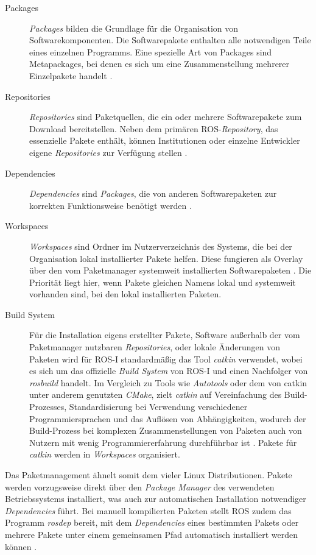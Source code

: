 \begin{description}
    \item[Packages] \textit{Packages} bilden die Grundlage für die Organisation von Softwarekomponenten. Die Softwarepakete enthalten alle notwendigen Teile eines einzelnen Programms. Eine spezielle Art von Packages sind Metapackages, bei denen es sich um eine Zusammenstellung mehrerer Einzelpakete handelt \cite[Absatz~1]{romero_rosconcepts_2014}.
    \item[Repositories] \textit{Repositories} sind Paketquellen, die ein oder mehrere Softwarepakete zum Download bereitstellen. Neben dem primären ROS-\textit{Repository}, das essenzielle Pakete enthält, können Institutionen oder einzelne Entwickler eigene \textit{Repositories} zur Verfügung stellen \cite[Absatz~1/3]{romero_rosconcepts_2014}.
    \item[Dependencies] \textit{Dependencies} sind \textit{Packages}, die von anderen Softwarepaketen zur korrekten Funktionsweise benötigt werden \cite[Absatz~1]{romero_rosconcepts_2014}.
    \item[Workspaces] \textit{Workspaces} sind Ordner im Nutzerverzeichnis des Systems, die bei der Organisation lokal installierter Pakete helfen. Diese fungieren als Overlay über den vom Paketmanager systemweit installierten Softwarepaketen \cite[Absatz~4]{thomas_catkinworkspaces_2017}. Die Priorität liegt hier, wenn Pakete gleichen Namens lokal und systemweit vorhanden sind, bei den lokal installierten Paketen.
    \item[Build System] Für die Installation eigens erstellter Pakete, Software außerhalb der vom Paketmanager nutzbaren \textit{Repositories}, oder lokale Änderungen von Paketen wird für \ac{ROS}-I standardmäßig das Tool \textit{catkin} verwendet, wobei es sich um das offizielle \textit{Build System} von \ac{ROS}-I und einen Nachfolger von \textit{rosbuild} handelt. Im Vergleich zu Tools wie \textit{Autotools} oder dem von catkin unter anderem genutzten \textit{CMake}, zielt \textit{catkin} auf Vereinfachung des Build-Prozesses, Standardisierung bei Verwendung verschiedener Programmiersprachen und das Auflösen von Abhängigkeiten, wodurch der Build-Prozess bei komplexen Zusammenstellungen von Paketen auch von Nutzern mit wenig Programmiererfahrung durchführbar ist \cite[Absatz~1.2]{van_eeden_catkinconceptual_overview_2020}. Pakete für \textit{catkin} werden in \textit{Workspaces} organisiert.
\end{description} 

Das Paketmanagement ähnelt somit dem vieler Linux Distributionen. Pakete werden vorzugsweise direkt über den \textit{Package Manager} des verwendeten Betriebssystems installiert, was auch zur automatischen Installation notwendiger \textit{Dependencies} führt. Bei manuell kompilierten Paketen stellt \ac{ROS} zudem das Programm \textit{rosdep} bereit, mit dem \textit{Dependencies} eines bestimmten Pakets oder mehrere Pakete unter einem gemeinsamen Pfad automatisch installiert werden können \cite[Absatz~2]{loretz_rosdep_2020}.


